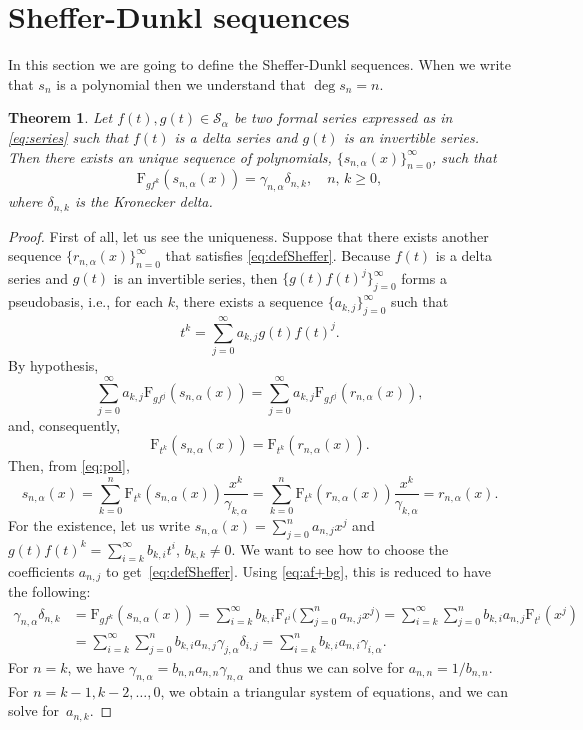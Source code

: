 \documentclass[11pt]{article}
\theoremstyle{plain}
\newtheorem{theorem}{Theorem}[section]
\theoremstyle{remark}
\numberwithin{equation}{section} %
\newcommand{\Sa}{\mathcal{S}_{\alpha}}
\newcommand{\FF}{\mathrm{F}}
\begin{document}
\section{Sheffer-Dunkl sequences}
\label{sec:sheffer}

In this section we are going to define the Sheffer-Dunkl sequences. When we write that $s_n$ is a polynomial then we understand that $\deg s_n = n$.

\begin{theorem}
\label{thm:S-D}
Let $f(t), g(t) \in \Sa$ be two formal series expressed as in \eqref{eq:series} such that $f(t)$ is a delta series and $g(t)$ is an invertible series. Then there exists an unique sequence of polynomials, $\{s_{n,\alpha}(x)\}_{n=0}^{\infty}$, such that
\begin{equation}
\label{eq:defSheffer}
\FF_{gf^k}(s_{n,\alpha}(x)) = \gamma_{n,\alpha}\delta_{n,k},\quad n,\,k\ge 0,
\end{equation}
where $\delta_{n,k}$ is the Kronecker delta.
\end{theorem} 

\begin{proof}
First of all, let us see the uniqueness. Suppose that there exists another sequence $\{r_{n,\alpha}(x)\}_{n=0}^{\infty}$ that satisfies \eqref{eq:defSheffer}. Because $f(t)$ is a delta series and $g(t)$ is an invertible series, then $\{g(t)f(t)^j\}_{j=0}^{\infty}$ forms a pseudobasis, 
i.e., for each $k$, there exists a sequence $\{a_{k,j}\}_{j = 0}^{\infty}$ such that
\[
t^k = \sum_{j=0}^{\infty} a_{k,j}g(t)f(t)^j.
\]
By hypothesis, 
\begin{equation*}
\sum_{j=0}^{\infty} a_{k,j} \FF_{gf^j}(s_{n,\alpha}(x)) 
= \sum_{j=0}^{\infty} a_{k,j} \FF_{gf^j}(r_{n,\alpha}(x)),
\end{equation*}
and, consequently,
\[
\FF_{t^k}(s_{n,\alpha}(x)) = \FF_{t^k}(r_{n,\alpha}(x)).
\]
Then, from \eqref{eq:pol},
\[
s_{n,\alpha}(x) = \sum_{k=0}^n \FF_{t^k}(s_{n,\alpha}(x)) \frac{x^k}{\gamma_{k,\alpha}}
= \sum_{k=0}^n {\FF_{t^k}(r_{n,\alpha}(x))} \frac{x^k}{\gamma_{k,\alpha}} = r_{n,\alpha}(x).
\]
For the existence, let us write $s_{n,\alpha}(x) = \sum_{j=0}^n a_{n,j}x^j$ 
and $g(t)f(t)^k = \sum_{i=k}^{\infty} b_{k,i}t^i$, $b_{k,k}\ne 0$. We want to see how to choose the coefficients $a_{n,j}$ to get~\eqref{eq:defSheffer}. Using \eqref{eq:af+bg}, this is reduced to have the following:
\begin{align*}
\gamma_{n,\alpha}\delta_{n,k}
&= \FF_{gf^k}(s_{n,\alpha}(x))
= \sum_{i=k}^{\infty} b_{k,i}
\FF_{t^i} \bigg(\sum_{j=0}^n a_{n,j}x^j\bigg)
= \sum_{i=k}^{\infty} \sum_{j = 0}^n b_{k,i}a_{n,j} \FF_{t^i}(x^j) \\
&= \sum_{i=k}^{\infty} \sum_{j = 0}^nb_{k,i}a_{n,j} \gamma_{j,\alpha} \delta_{i,j}
= \sum_{i=k}^{n} b_{k,i}a_{n,i}\gamma_{i,\alpha}.
\end{align*}
For $n = k$, we have $\gamma_{n,\alpha} = b_{n,n}a_{n,n}\gamma_{n,\alpha}$ and thus we can solve for $a_{n,n} = 1/b_{n,n}$. For $n = k-1, k-2,\ldots, 0$, we obtain a triangular system of equations, and we can solve for~$a_{n,k}$.
\end{proof}
\end{document}
